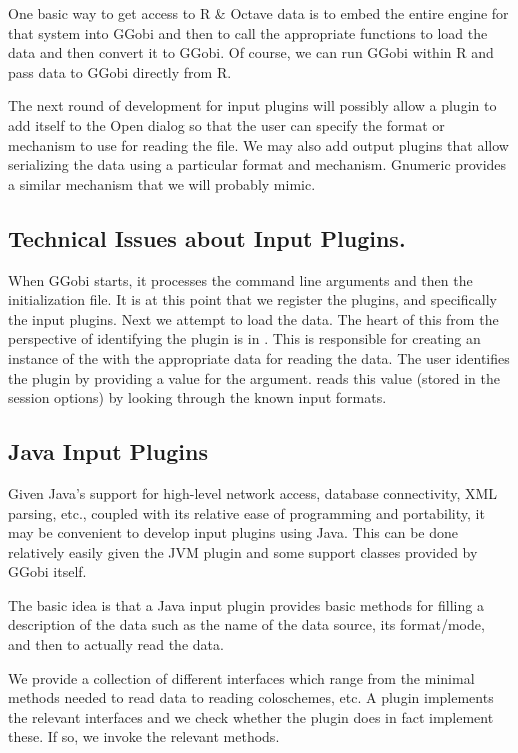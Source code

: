 \documentclass{article}
\def\file#1{\href{#1}{\Escape{#1}}}
\begin{document}
One basic way to get access to R \& Octave data is to embed the entire
engine for that system into GGobi and then to call the appropriate
functions to load the data and then convert it to GGobi.  Of course,
we can run GGobi within R and pass data to GGobi directly from R.


The next round of development for input plugins will possibly allow a
plugin to add itself to the Open dialog so that the user can specify
the format or mechanism to use for reading the file.  We may also add
output plugins that allow serializing the data using a particular
format and mechanism. Gnumeric provides a similar mechanism that we
will probably mimic.


\subsection{Technical Issues about Input Plugins.}
When GGobi starts, it processes the command line arguments and then the
initialization file.  It is at this point that we register the
plugins, and specifically the input plugins.  Next we attempt to load
the data.  The heart of this from the perspective of identifying the
plugin is  in \file{make_ggobi.c}.  This is
responsible for creating an instance of the 
with the appropriate data for reading the data.  The user identifies
the plugin by providing a value for the  argument.
 reads this value (stored in the session
options) by looking through the known input formats.

\subsection{Java Input Plugins}

Given Java's support for high-level network access, database
connectivity, XML parsing, etc., coupled with its relative ease of
programming and portability, it may be convenient to develop input
plugins using Java.  This can be done relatively easily given the JVM
plugin and some support classes provided by GGobi itself.

The basic idea is that a Java input plugin provides basic methods for
filling a description of the data such as the name of the data source,
its format/mode, and then to actually read the data.



We provide a collection of different interfaces which range from the
minimal methods needed to read data to reading coloschemes, etc.  A
plugin implements the relevant interfaces and we check whether the
plugin does in fact implement these. If so, we invoke the relevant
methods.
\end{document}

